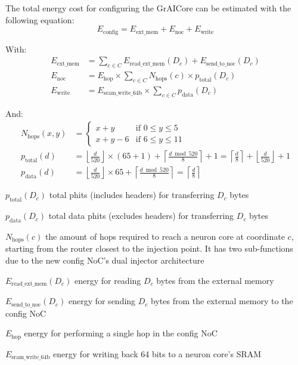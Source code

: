 The total energy cost for configuring the GrAICore can be estimated with the following equation:
\begin{equation}
    E_{\textrm{config}} = E_{\textrm{ext\_mem}} + E_{\textrm{noc}} + E_{\textrm{write}}
\end{equation}

With:
\begin{align*} 
E_{\textrm{ext\_mem}} &= 
        \sum_{c \in C}^{}{E_\textrm{read\_ext\_mem}(D_c) + E_{\textrm{send\_to\_noc}}(D_c)} \\
E_{\textrm{noc}} &=
    E_{\textrm{hop}} \times \sum_{c \in C}^{}{N_\textrm{hops}(c) \times p_{\textrm{total}}(D_c)} \\
E_{\textrm{write}} &=
    E_{\textrm{sram\_write\_64b}} \times \sum_{c \in C}^{}{p_{\textrm{data}}(D_c)}
\end{align*}

And:
\begin{align*} 
N_{\textrm{hops}}(x,y) &=
    \begin{cases} 
        x + y & \textrm{if } 0 \leq y \leq 5 \\
        x + y - 6 & \text{if } 6 \leq y \leq 11
    \end{cases}
\\
p_{\textrm{total}}(d) &=
    \left\lfloor \frac{d}{520} \right\rfloor \times (65 + 1) + \left\lceil \frac{d \bmod 520}{8} \right\rceil + 1 =
    \left\lceil \frac{d}{8} \right\rceil + \left\lfloor \frac{d}{520} \right\rfloor + 1 
\\
p_{\textrm{data}}(d) &=
    \left\lfloor \frac{d}{520} \right\rfloor \times 65 + \left\lceil \frac{d \bmod 520}{8} \right\rceil =
    \left\lceil \frac{d}{8} \right\rceil
\end{align*}

\begin{eqexpl}[15mm]
    \item{$p_{\textrm{total}}(D_c)$} total phits (includes headers) for transferring $D_c$ bytes
    \item{$p_{\textrm{data}}(D_c)$} total data phits (excludes headers) for transferring $D_c$ bytes
    \item{$N_{\textrm{hops}}(c)$} the amount of hops required to reach a neuron core at coordinate $c$, starting from the router closest to the injection point. It has two sub-functions due to the new config NoC's dual injector architecture
    \item{$E_{\textrm{read\_ext\_mem}}(D_c)$} energy for reading $D_c$ bytes from the external memory
    \item{$E_{\textrm{send\_to\_noc}}(D_c)$} energy for sending $D_c$ bytes from the external memory to the config NoC
    \item{$E_{\textrm{hop}}$} energy for performing a single hop in the config NoC
    \item{$E_{\textrm{sram\_write\_64b}}$} energy for writing back 64 bits to a neuron core's SRAM
\end{eqexpl}

